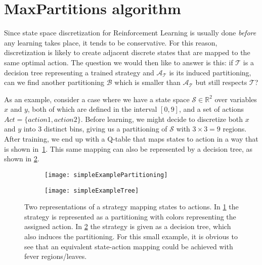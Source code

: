 \section{MaxPartitions algorithm}%
\label{sec:maxParts}

Since state space discretization for Reinforcement Learning is usually done
\textit{before} any learning takes place, it tends to be conservative. For this
reason, discretization is likely to create adjacent discrete states that are
mapped to the same optimal action. The question we would then like to answer is
this: if $\mathcal{T}$ is a decision tree representing a trained strategy and
$\mathcal{A}_{\mathcal{T}}$ is its induced partitioning, can we find another
partitioning $\mathcal{B}$ which is smaller than $\mathcal{A}_{\mathcal{T}}$ but
still respects $\mathcal{T}$?

As an example, consider a case where we have a state space $\mathcal{S} \in
\mathbb{R}^2$ over variables $x$ and $y$, both of which are defined in the
interval $[0,9]$, and a set of actions $Act = \{ action1, action2 \}$. Before
learning, we might decide to discretize both $x$ and $y$ into 3 distinct bins,
giving us a partitioning of $\mathcal{S}$ with $3\times3 = 9$ regions. After
training, we end up with a Q-table that maps states to action in a way that is
shown in~\cref{fig:simpleExamplePartitioning}. This same mapping can also be
represented by a decision tree, as shown in \cref{fig:simpleExampleTree}.

\begin{figure}[!ht]
    \centering
    \begin{subfigure}{0.4\textwidth}
        \texttt{[image: simpleExamplePartitioning]}%
        \caption{}%
        \label{fig:simpleExamplePartitioning}
    \end{subfigure}
    \begin{subfigure}{0.4\textwidth}
      \texttt{[image: simpleExampleTree]}%
      \caption{}%
      \label{fig:simpleExampleTree}
    \end{subfigure}

  \caption{%
    Two representations of a strategy mapping states to actions. In
    \cref{fig:simpleExamplePartitioning} the strategy is represented as a
    partitioning with colors representing the assigned action. In
    \cref{fig:simpleExampleTree} the strategy is given as a decision
    tree, which also induces the partitioning. For this small example, it is
    obvious to see that an equivalent state-action mapping could be achieved
    with fever regions/leaves.
  }%
  \label{fig:simpleExample}
\end{figure}

